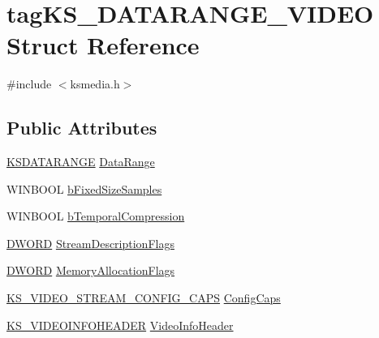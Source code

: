 \hypertarget{structtag_k_s___d_a_t_a_r_a_n_g_e___v_i_d_e_o}{}\section{tag\+K\+S\+\_\+\+D\+A\+T\+A\+R\+A\+N\+G\+E\+\_\+\+V\+I\+D\+EO Struct Reference}
\label{structtag_k_s___d_a_t_a_r_a_n_g_e___v_i_d_e_o}


{\ttfamily \#include $<$ksmedia.\+h$>$}

\subsection*{Public Attributes}
\begin{DoxyCompactItemize}
\item 
\hyperlink{ks_8h_a1ea8bc535eaf96036403dc325623b469}{K\+S\+D\+A\+T\+A\+R\+A\+N\+GE} \hyperlink{structtag_k_s___d_a_t_a_r_a_n_g_e___v_i_d_e_o_ac860e4026ca98f6e33534fed0772a67d}{Data\+Range}
\item 
W\+I\+N\+B\+O\+OL \hyperlink{structtag_k_s___d_a_t_a_r_a_n_g_e___v_i_d_e_o_a2aa086b3781ca28220bfcc49b140c8ee}{b\+Fixed\+Size\+Samples}
\item 
W\+I\+N\+B\+O\+OL \hyperlink{structtag_k_s___d_a_t_a_r_a_n_g_e___v_i_d_e_o_a1ffcf7fc0d146b05986c0a6c7bcc15d6}{b\+Temporal\+Compression}
\item 
\hyperlink{mapinls_8h_ad342ac907eb044443153a22f964bf0af}{D\+W\+O\+RD} \hyperlink{structtag_k_s___d_a_t_a_r_a_n_g_e___v_i_d_e_o_a260342ce186439e8206e025862a624e8}{Stream\+Description\+Flags}
\item 
\hyperlink{mapinls_8h_ad342ac907eb044443153a22f964bf0af}{D\+W\+O\+RD} \hyperlink{structtag_k_s___d_a_t_a_r_a_n_g_e___v_i_d_e_o_a23f71ed56165290abf6a7d7c6618ae34}{Memory\+Allocation\+Flags}
\item 
\hyperlink{ksmedia_8h_a6206e1a832fffa713842974c34128ade}{K\+S\+\_\+\+V\+I\+D\+E\+O\+\_\+\+S\+T\+R\+E\+A\+M\+\_\+\+C\+O\+N\+F\+I\+G\+\_\+\+C\+A\+PS} \hyperlink{structtag_k_s___d_a_t_a_r_a_n_g_e___v_i_d_e_o_a29e153843bb90e9912691fe65cf42866}{Config\+Caps}
\item 
\hyperlink{ksmedia_8h_ade1656979c41e0f7252475edf5e86528}{K\+S\+\_\+\+V\+I\+D\+E\+O\+I\+N\+F\+O\+H\+E\+A\+D\+ER} \hyperlink{structtag_k_s___d_a_t_a_r_a_n_g_e___v_i_d_e_o_a2ef910ad134685bafb37f9ef2ea6e1c9}{Video\+Info\+Header}
\end{DoxyCompactItemize}



